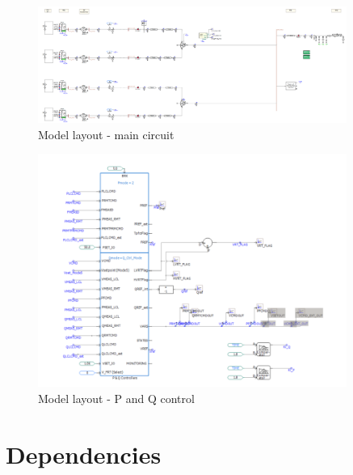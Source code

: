 \documentclass{../grid-link-report}
\begin{document}
		
	\begin{figure}[H]
		\centering
		\includegraphics[width=0.9\textwidth]{report-assets/images/pscad-model-layout1.png}
		\caption{Model layout - main circuit}
		\label{fig:model-layout1}
	\end{figure}
	
	
		\begin{figure}[H]
		\centering
		\includegraphics[width=0.9\textwidth]{report-assets/images/pscad-model-layout2.png}
		\caption{Model layout - P and Q control}
		\label{fig:model-layout2}
	\end{figure}
	
	
	\section{Dependencies}
	
\end{document}
